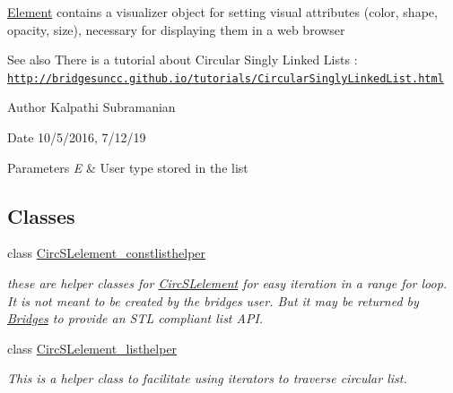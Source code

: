 \hyperlink{classbridges_1_1datastructure_1_1_element}{Element} contains a visualizer object for setting visual attributes (color, shape, opacity, size), necessary for displaying them in a web browser

\begin{DoxySeeAlso}{See also}
There is a tutorial about Circular Singly Linked Lists \+: \href{http://bridgesuncc.github.io/tutorials/CircularSinglyLinkedList.html}{\tt http\+://bridgesuncc.\+github.\+io/tutorials/\+Circular\+Singly\+Linked\+List.\+html}
\end{DoxySeeAlso}
\begin{DoxyAuthor}{Author}
Kalpathi Subramanian 
\end{DoxyAuthor}
\begin{DoxyDate}{Date}
10/5/2016, 7/12/19
\end{DoxyDate}

\begin{DoxyParams}{Parameters}
{\em E} & User type stored in the list \\
\hline
\end{DoxyParams}
\subsection*{Classes}
\begin{DoxyCompactItemize}
\item 
class \hyperlink{classbridges_1_1datastructure_1_1_circ_s_lelement_1_1_circ_s_lelement__constlisthelper}{Circ\+S\+Lelement\+\_\+constlisthelper}
\begin{DoxyCompactList}\small\item\em these are helper classes for \hyperlink{classbridges_1_1datastructure_1_1_circ_s_lelement}{Circ\+S\+Lelement} for easy iteration in a range for loop. It is not meant to be created by the bridges user. But it may be returned by \hyperlink{classbridges_1_1_bridges}{Bridges} to provide an S\+TL compliant list A\+PI. \end{DoxyCompactList}\item 
class \hyperlink{classbridges_1_1datastructure_1_1_circ_s_lelement_1_1_circ_s_lelement__listhelper}{Circ\+S\+Lelement\+\_\+listhelper}
\begin{DoxyCompactList}\small\item\em This is a helper class to facilitate using iterators to traverse circular list. \end{DoxyCompactList}\end{DoxyCompactItemize}
